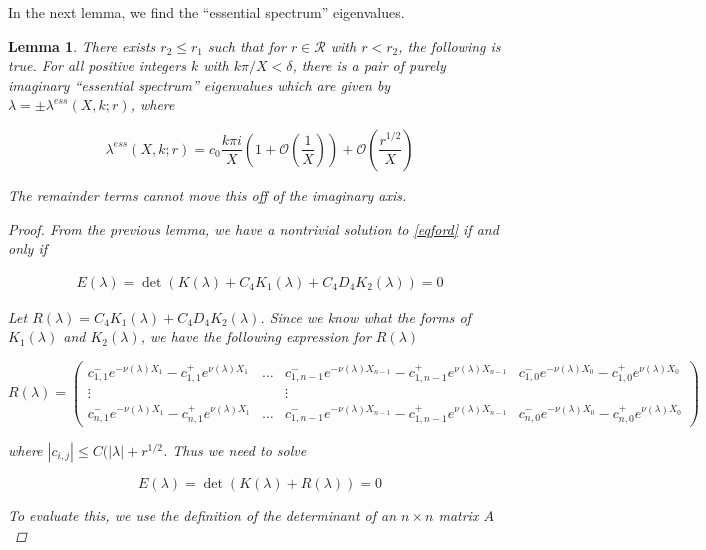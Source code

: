 \documentclass[12pt]{article}
\newtheorem{lemma}{Lemma}
\begin{document}
In the next lemma, we find the ``essential spectrum'' eigenvalues.

\begin{lemma}\label{essspeclemma}
There exists $r_2 \leq r_1$ such that for $r \in \mathcal{R}$ with $r < r_2$, the following is true. For all positive integers $k$ with $k \pi / X < \delta$, there is a pair of purely imaginary ``essential spectrum'' eigenvalues which are given by $\lambda = \pm \lambda^{ess}(X,k; r)$, where

\begin{equation}\label{lambdaess}
\lambda^{ess}(X, k; r) = c_0 \frac{k \pi i }{X} \left( 1 + \mathcal{O}\left( \frac{1}{X} \right)\right) + \mathcal{O}\left( \frac{r^{1/2}}{X} \right)
\end{equation}

The remainder terms cannot move this off of the imaginary axis.

\begin{proof}
From the previous lemma, we have a nontrivial solution to \eqref{eqford} if and only if 

\begin{align*}
E(\lambda) = \det (K(\lambda) + C_4 K_1(\lambda) + C_4 D_4 K_2(\lambda)) = 0
\end{align*}

Let $R(\lambda) = C_4 K_1(\lambda) + C_4 D_4 K_2(\lambda)$. Since we know what the forms of $K_1(\lambda)$ and $K_2(\lambda)$, we have the following expression for $R(\lambda)$

\[
R(\lambda) = 
\begin{pmatrix}
c_{1,1}^- e^{-\nu(\lambda)X_1} - c_{1,1}^+ e^{\nu(\lambda)X_1} 
& \dots & 
c_{1, n-1}^- e^{-\nu(\lambda)X_{n-1}} - c_{1,n-1}^+ e^{\nu(\lambda)X_{n-1}} &
c_{1,0}^- e^{-\nu(\lambda)X_0} - c_{1,0}^+ e^{\nu(\lambda)X_0}  \\
\vdots & & \vdots & \\
c_{n,1}^- e^{-\nu(\lambda)X_1} - c_{n,1}^+ e^{\nu(\lambda)X_1}
& \dots & 
c_{1, n-1}^- e^{-\nu(\lambda)X_{n-1}} - c_{1,n-1}^+ e^{\nu(\lambda)X_{n-1}} &
c_{n,0}^- e^{-\nu(\lambda)X_0} - c_{n,0}^+ e^{\nu(\lambda)X_0} 
\end{pmatrix}
\]

where $|c_{i,j}| \leq C(|\lambda| + r^{1/2}$. Thus we need to solve

\[
E(\lambda) = \det(K(\lambda) + R(\lambda)) = 0
\]

To evaluate this, we use the definition of the determinant of an $n \times n$ matrix $A$


\end{proof}
\end{lemma}
\end{document}
